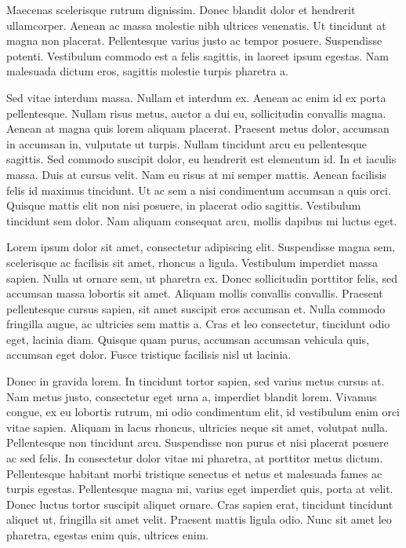 \documentclass[a4paper,twoside,notitlepage,openright,11pt]{report}
\begin{document}
Maecenas scelerisque rutrum dignissim. Donec blandit dolor et hendrerit ullamcorper. Aenean ac massa molestie nibh ultrices venenatis. Ut tincidunt at magna non placerat. Pellentesque varius justo ac tempor posuere. Suspendisse potenti. Vestibulum commodo est a felis sagittis, in laoreet ipsum egestas. Nam malesuada dictum eros, sagittis molestie turpis pharetra a.

Sed vitae interdum massa. Nullam et interdum ex. Aenean ac enim id ex porta pellentesque. Nullam risus metus, auctor a dui eu, sollicitudin convallis magna. Aenean at magna quis lorem aliquam placerat. Praesent metus dolor, accumsan in accumsan in, vulputate ut turpis. Nullam tincidunt arcu eu pellentesque sagittis. Sed commodo suscipit dolor, eu hendrerit est elementum id. In et iaculis massa. Duis at cursus velit. Nam eu risus at mi semper mattis. Aenean facilisis felis id maximus tincidunt. Ut ac sem a nisi condimentum accumsan a quis orci. Quisque mattis elit non nisi posuere, in placerat odio sagittis. Vestibulum tincidunt sem dolor. Nam aliquam consequat arcu, mollis dapibus mi luctus eget.

Lorem ipsum dolor sit amet, consectetur adipiscing elit. Suspendisse magna sem, scelerisque ac facilisis sit amet, rhoncus a ligula. Vestibulum imperdiet massa sapien. Nulla ut ornare sem, ut pharetra ex. Donec sollicitudin porttitor felis, sed accumsan massa lobortis sit amet. Aliquam mollis convallis convallis. Praesent pellentesque cursus sapien, sit amet suscipit eros accumsan et. Nulla commodo fringilla augue, ac ultricies sem mattis a. Cras et leo consectetur, tincidunt odio eget, lacinia diam. Quisque quam purus, accumsan accumsan vehicula quis, accumsan eget dolor. Fusce tristique facilisis nisl ut lacinia.

Donec in gravida lorem. In tincidunt tortor sapien, sed varius metus cursus at. Nam metus justo, consectetur eget urna a, imperdiet blandit lorem. Vivamus congue, ex eu lobortis rutrum, mi odio condimentum elit, id vestibulum enim orci vitae sapien. Aliquam in lacus rhoncus, ultricies neque sit amet, volutpat nulla. Pellentesque non tincidunt arcu. Suspendisse non purus et nisi placerat posuere ac sed felis. In consectetur dolor vitae mi pharetra, at porttitor metus dictum. Pellentesque habitant morbi tristique senectus et netus et malesuada fames ac turpis egestas. Pellentesque magna mi, varius eget imperdiet quis, porta at velit. Donec luctus tortor suscipit aliquet ornare. Cras sapien erat, tincidunt tincidunt aliquet ut, fringilla sit amet velit. Praesent mattis ligula odio. Nunc sit amet leo pharetra, egestas enim quis, ultrices enim.
\end{document}
